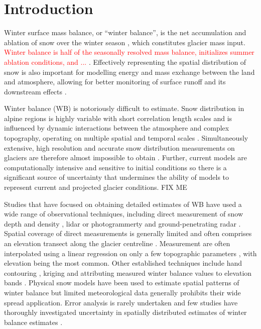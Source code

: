 \documentclass[twocolumn, letterpaper]{igs}
\begin{document}
\section{Introduction}

Winter surface mass balance, or ``winter balance'', is the net accumulation and ablation of snow over the winter season \citep{Cogley2011}, which constitutes glacier mass input. \textcolor{red}{Winter balance is half of the seasonally resolved mass balance, initializes summer ablation conditions, and ...} \citep[e.g.][]{Hock2005,Reveillet2016}. Effectively representing the spatial distribution of snow is also important for modelling energy and mass exchange between the land and atmosphere, allowing for better monitoring of surface runoff and its downstream effects \citep[e.g.][]{Clark2011}.

Winter balance (WB) is notoriously difficult to estimate. Snow distribution in alpine regions is highly variable with short correlation length scales \citep[e.g.][]{Anderton2004, Egli2011, Grunewald2010, Helbig2017, Lopez2011, Lopez2013, Machguth2006, Marshall2006} and is influenced by dynamic interactions between the atmosphere and complex topography, operating on multiple spatial and temporal scales \citep[e.g.][]{Barry1992, Liston2006, Clark2011}. Simultaneously extensive, high resolution and accurate snow distribution measurements on glaciers are therefore almost impossible to obtain \citep[e.g.][]{Cogley2011, McGrath2015}. Further, current models are computationally intensive and sensitive to initial conditions so there is a significant source of uncertainty that undermines the ability of models to represent current and projected glacier conditions. FIX ME

Studies that have focused on obtaining detailed estimates of WB have used a wide range of observational techniques, including direct measurement of snow depth and density \citep[e.g.][]{Cullen2017}, lidar or photogrammerty \citep[e.g.][]{Sold2013} and ground-penetrating radar \citep[e.g.][]{Machguth2006, Gusmeroli2014, McGrath2015}. Spatial coverage of direct measurements is generally limited and often comprises an elevation transect along the glacier centreline \citep[e.g.][]{Kaser2003}. Measurement are often interpolated using a linear regression on only a few topographic parameters \citep[e.g.][]{MacDougall2011}, with elevation being the most common. Other established techniques include hand contouring \citep[e.g.][]{Tangborn1975}, kriging \citep[e.g.][]{Hock1999} and attributing measured winter balance values to elevation bands \citep[e.g.][]{Thibert2008}. Physical snow models have been used to estimate spatial patterns of winter balance \citep[e.g.][]{Mott2008, Schuler2008, Dadic2010} but limited meteorological data generally prohibits their wide spread application. Error analysis is rarely undertaken and few studies have thoroughly investigated uncertainty in spatially distributed estimates of winter balance estimates \citep[c.f.][]{Schuler2008}. 
\end{document}

